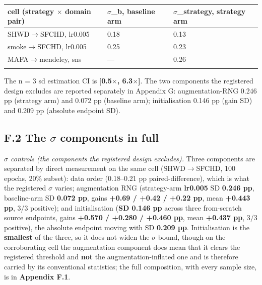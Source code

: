 \documentclass[pdflatex,sn-mathphys-ay]{sn-jnl}
\begin{document}
{\footnotesize
\setlength{\tabcolsep}{4pt}
\begin{longtable}{p{}p{}p{}}
\toprule
cell (strategy \ensuremath{\times} domain pair) & \ensuremath{\sigma}\_b, baseline arm & \ensuremath{\sigma}\_strategy, strategy arm \\
\midrule
\endhead
SHWD\ensuremath{\rightarrow}SFCHD, lr0.005 & 0.18 & 0.13 \\
smoke\ensuremath{\rightarrow}SFCHD, lr0.005 & 0.25 & 0.23 \\
MAFA\ensuremath{\rightarrow}mendeley, sns & --- & 0.26 \\
\botrule
\end{longtable}}

The n = 3 sd estimation CI is \textbf{[0.5\ensuremath{\times}, 6.3\ensuremath{\times}]}. The two components the registered design excludes are reported separately in Appendix G: augmentation-RNG 0.246 pp (strategy arm) and 0.072 pp (baseline arm); initialisation 0.146 pp (gain SD) and 0.209 pp (absolute endpoint SD).

\subsection*{F.2 The \ensuremath{\sigma} components in full}

\emph{\ensuremath{\sigma} controls (the components the registered design excludes).} Three components are separated by direct measurement on the same cell (SHWD\ensuremath{\rightarrow}SFCHD, 100 epochs, 20\% subset): data order (0.18--0.21 pp paired-difference), which is what the registered \ensuremath{\sigma} varies; augmentation RNG (strategy-arm \textbf{lr0.005} SD \textbf{0.246 pp}, baseline-arm SD \textbf{0.072 pp}, gains \textbf{+0.69 / +0.42 / +0.22 pp}, mean \textbf{+0.443 pp}, 3/3 positive); and initialisation (\textbf{SD 0.146 pp} across three from-scratch source endpoints, gains \textbf{+0.570 / +0.280 / +0.460 pp}, mean \textbf{+0.437 pp}, 3/3 positive), the absolute endpoint moving with SD \textbf{0.209 pp}. Initialisation is the \textbf{smallest} of the three, so it does not widen the \ensuremath{\sigma} bound, though on the corroborating cell the augmentation component does mean that it clears the registered threshold and \textbf{not} the augmentation-inflated one and is therefore carried by its conventional statistics; the full composition, with every sample size, is in \textbf{Appendix F.1}.
\end{document}
